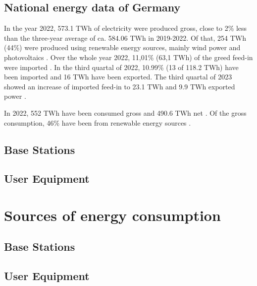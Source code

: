 \documentclass[11pt,a4paper]{article}
\begin{document}
\subsection{National energy data of Germany}\label{subsec:nationalaverage}
In the year 2022, 573.1 TWh of electricity were produced gross, close to 2\% less than the three-year average of ca. 584.06 TWh in 2019-2022.
Of that, 254 TWh (44\%) were produced using renewable energy sources, mainly wind power and photovoltaics \citep{Bruttostromerzeugung}.
Over the whole year 2022, 11,01\% (63,1 TWh) of the greed feed-in were imported \citep{energieErzeugung}.
In the third quartal of 2022, 10.99\% (13 of 118.2 TWh) have been imported and 16 TWh have been exported.
The third quartal of 2023 showed an increase of imported feed-in to 23.1 TWh and 9.9 TWh exported power \citep{stromerzeugung3Quartal2023}.

In 2022, 552 TWh have been consumed gross \citep{Stromverbrauch} and 490.6 TWh net \citep{NettoStromverbrauch}.
Of the gross consumption, 46\% have been from renewable energy sources \citep{Stromverbrauch}.

\subsection{Base Stations}\label{subsec:BSInfluence}


\subsection{User Equipment}\label{subsec:UEInfluence}


\section{Sources of energy consumption}\label{sec:energyconsumption}
\subsection{Base Stations}\label{subsec:BSConsumption}


\subsection{User Equipment}\label{subsec:UEConsumption}
\end{document}
